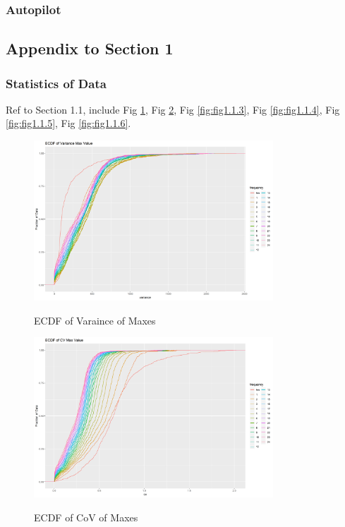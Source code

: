 \documentclass{article}
\begin{document}
\subsubsection{Autopilot}

\subsection{Appendix to Section 1}

\subsubsection{Statistics of Data}

Ref to Section 1.1, include Fig \ref{fig:fig1.1.1}, Fig \ref{fig:fig1.1.2}, Fig \ref{fig:fig1.1.3}, Fig \ref{fig:fig1.1.4}, Fig \ref{fig:fig1.1.5}, Fig \ref{fig:fig1.1.6}.

\begin{figure}[htbp]
\caption{ECDF of Varaince of Maxes}
\centering
\includegraphics[width = 0.8\textwidth]{ECDFofVarianceMaxValue}
\label{fig:fig1.1.1}
\end{figure}

\begin{figure}[htbp]
\caption{ECDF of CoV of Maxes}
\centering
\includegraphics[width = 0.8\textwidth]{ECDFofCVMaxValue}
\label{fig:fig1.1.2}
\end{figure}
\end{document}
